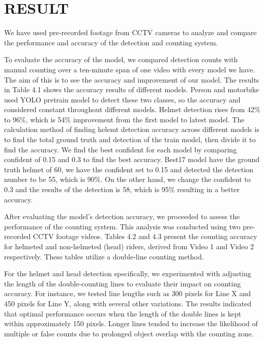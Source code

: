 \chapter{RESULT}

\noindent\hspace{2.5em}We have used pre-recorded footage from CCTV cameras to analyze and compare the performance and accuracy of the detection and counting system. 

\vspace{1em}

\noindent\hspace{2.5em}To evaluate the accuracy of the model, we compared detection counts with manual counting over a ten-minute span of one video with every model we have. The aim of this is to see the accuracy and improvement of our model. The results in Table 4.1 shows the accuracy results of different models. Person and motorbike used YOLO pretrain model to detect these two classes, so the accuracy and considered constant throughout different models. Helmet detection rises from 42\% to 96\%, which is 54\% improvement from the first model to latest model. The calculation method of finding helemt detection accuracy across different models is to find the total ground truth and detection of the train model, then divide it to find the accuracy. We find the best confident for each model by comparing confident of 0.15 and 0.3 to find the best accuracy. Best17 model have the ground truth helmet of 60, we have the confident set to 0.15 and detected the detection number to be 55, which is 90\%. On the other hand, we change the confident to 0.3 and the results of the detection is 58, which is 95\% resulting in a better accuracy.

\vspace{1em}

\noindent\hspace{2.5em}After evaluating the model's detection accuracy, we proceeded to assess the performance of the counting system. This analysis was conducted using two pre-recorded CCTV footage videos. Tables 4.2 and 4.3 present the counting accuracy for helmeted and non-helmeted (head) riders, derived from Video 1 and Video 2 respectively. These tables utilize a double-line counting method.

\vspace{1em}
For the helmet and head detection specifically, we experimented with adjusting the length of the double-counting lines to evaluate their impact on counting accuracy. For instance, we tested line lengths such as 300 pixels for Line X and 450 pixels for Line Y, along with several other variations. The results indicated that optimal performance occurs when the length of the double lines is kept within approximately 150 pixels. Longer lines tended to increase the likelihood of multiple or false counts due to prolonged object overlap with the counting zone.

